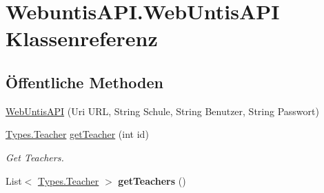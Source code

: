 \hypertarget{class_webuntis_a_p_i_1_1_web_untis_a_p_i}{\section{Webuntis\-A\-P\-I.\-Web\-Untis\-A\-P\-I Klassenreferenz}
\label{class_webuntis_a_p_i_1_1_web_untis_a_p_i}
}
\subsection*{Öffentliche Methoden}
\begin{DoxyCompactItemize}
\item 
\hyperlink{class_webuntis_a_p_i_1_1_web_untis_a_p_i_ab63b122fb71102686f96b2a79fafb8b8}{Web\-Untis\-A\-P\-I} (Uri U\-R\-L, String Schule, String Benutzer, String Passwort)
\item 
\hyperlink{struct_webuntis_a_p_i_1_1_types_1_1_teacher}{Types.\-Teacher} \hyperlink{class_webuntis_a_p_i_1_1_web_untis_a_p_i_ae0ff36ba0b419981afa923a3d39a39da}{get\-Teacher} (int id)
\begin{DoxyCompactList}\small\item\em Get Teachers. \end{DoxyCompactList}\item 
\hypertarget{class_webuntis_a_p_i_1_1_web_untis_a_p_i_a6224a42969b28de78a9370745fb44efb}{List$<$ \hyperlink{struct_webuntis_a_p_i_1_1_types_1_1_teacher}{Types.\-Teacher} $>$ {\bfseries get\-Teachers} ()}\label{class_webuntis_a_p_i_1_1_web_untis_a_p_i_a6224a42969b28de78a9370745fb44efb}


\end{DoxyCompactItemize}
